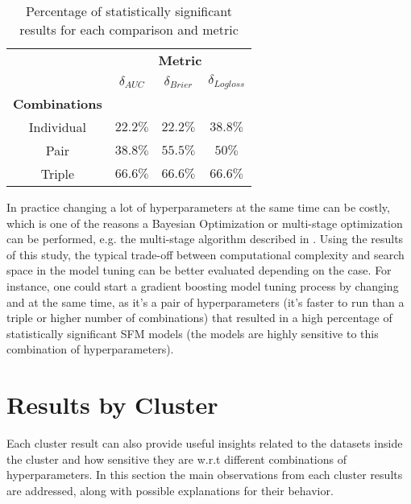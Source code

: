 \begin{table}[H]
    \centering
    \begin{tabular}{l|lcc}
              & \multicolumn{3}{c}{\textbf{Metric}}                                 \\
              & \multicolumn{1}{c}{$\delta_{AUC}$} &  \multicolumn{1}{c}{$\delta_{Brier}$} &  \multicolumn{1}{c}{$\delta_{Logloss}$} \\
    \textbf{Combinations} &          & \multicolumn{1}{l}{} & \multicolumn{1}{l}{} \\
    \midrule
   \multicolumn{1}{c}{Individual} & $22.2\%$ & $22.2\%$ & $38.8\%$\\
   \multicolumn{1}{c}{Pair}       & $38.8\%$ & $55.5\%$ & $50\%$\\
   \multicolumn{1}{c}{Triple}     & $66.6\%$ & $66.6\%$ & $66.6\%$
    \end{tabular}
    \caption{Percentage of statistically significant results for each comparison and metric}
    \label{table:stats-combination}
\end{table}

In practice changing a lot of hyperparameters at the same time can be costly, which is one of the reasons a Bayesian Optimization or multi-stage optimization can be performed, e.g. the multi-stage algorithm described in \cite{wang-etal-2015-efficient}. Using the results of this study, the typical trade-off between computational complexity and search space in the model tuning can be better evaluated depending on the case. For instance, one could start a gradient boosting model tuning process by changing  and  at the same time, as it's a pair of hyperparameters (it's faster to run than a triple or higher number of combinations) that resulted in a high percentage of statistically significant SFM models (the models are highly sensitive to this combination of hyperparameters).

    
\section{Results by Cluster}

Each cluster result can also provide useful insights related to the datasets inside the cluster and how sensitive they are w.r.t different combinations of hyperparameters. In this section the main observations from each cluster results are addressed, along with possible explanations for their behavior.
